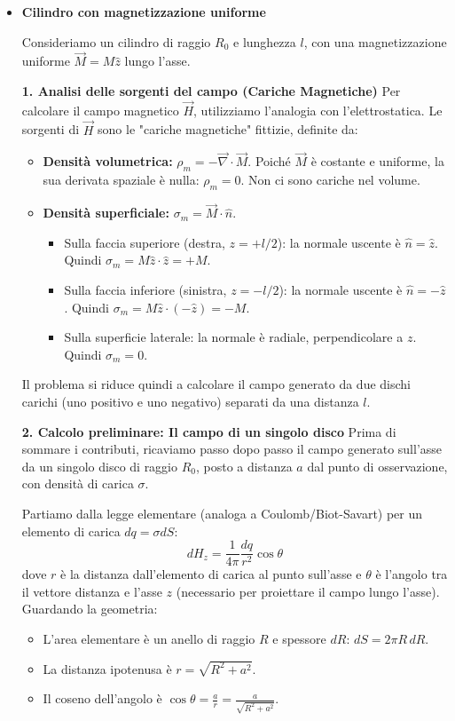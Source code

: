 \documentclass{book}
\begin{document}
\begin{itemize}

 \item \textbf{Cilindro con magnetizzazione uniforme}

Consideriamo un cilindro di raggio \(R_0\) e lunghezza \(l\), con una magnetizzazione uniforme \(\vec{M}=M\hat{z}\) lungo l'asse.

\textbf{1. Analisi delle sorgenti del campo (Cariche Magnetiche)}
Per calcolare il campo magnetico \(\vec{H}\), utilizziamo l'analogia con l'elettrostatica. Le sorgenti di \(\vec{H}\) sono le "cariche magnetiche" fittizie, definite da:
\begin{itemize}
    \item \textbf{Densità volumetrica:} \(\rho_m = -\vec{\nabla}\cdot\vec{M}\). Poiché \(\vec{M}\) è costante e uniforme, la sua derivata spaziale è nulla: \(\rho_m = 0\). Non ci sono cariche nel volume.
    \item \textbf{Densità superficiale:} \(\sigma_m = \vec{M}\cdot\hat{n}\).
    \begin{itemize}
        \item Sulla faccia superiore (destra, \(z=+l/2\)): la normale uscente è \(\hat{n}=\hat{z}\). Quindi \(\sigma_m = M\hat{z}\cdot\hat{z} = +M\).
        \item Sulla faccia inferiore (sinistra, \(z=-l/2\)): la normale uscente è \(\hat{n}=-\hat{z}\). Quindi \(\sigma_m = M\hat{z}\cdot(-\hat{z}) = -M\).
        \item Sulla superficie laterale: la normale è radiale, perpendicolare a \(z\). Quindi \(\sigma_m = 0\).
    \end{itemize}
\end{itemize}
Il problema si riduce quindi a calcolare il campo generato da due dischi carichi (uno positivo e uno negativo) separati da una distanza \(l\).

\textbf{2. Calcolo preliminare: Il campo di un singolo disco}
Prima di sommare i contributi, ricaviamo passo dopo passo il campo generato sull'asse da un singolo disco di raggio \(R_0\), posto a distanza \(a\) dal punto di osservazione, con densità di carica \(\sigma\).

Partiamo dalla legge elementare (analoga a Coulomb/Biot-Savart) per un elemento di carica \(dq = \sigma dS\):
\[
dH_z = \frac{1}{4\pi} \frac{dq}{r^2} \cos\theta
\]
dove \(r\) è la distanza dall'elemento di carica al punto sull'asse e \(\theta\) è l'angolo tra il vettore distanza e l'asse \(z\) (necessario per proiettare il campo lungo l'asse).
Guardando la geometria:
\begin{itemize}
    \item L'area elementare è un anello di raggio \(R\) e spessore \(dR\): \(dS = 2\pi R \, dR\).
    \item La distanza ipotenusa è \(r = \sqrt{R^2 + a^2}\).
    \item Il coseno dell'angolo è \(\cos\theta = \frac{a}{r} = \frac{a}{\sqrt{R^2 + a^2}}\).
\end{itemize}


\end{itemize}
\end{document}
